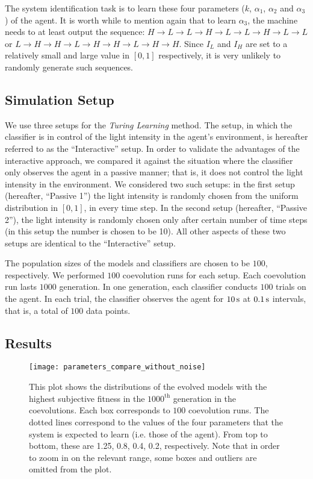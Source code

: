 The system identification task is to learn these four parameters ($k$, $\alpha_1$, $\alpha_2$ and $\alpha_3$) of the agent. It is worth while to mention again that to learn $\alpha_3$, the machine needs to at least output the sequence: $H\rightarrow L\rightarrow L\rightarrow H\rightarrow L\rightarrow L\rightarrow H\rightarrow L\rightarrow L$ or $L\rightarrow H\rightarrow H\rightarrow L\rightarrow H\rightarrow H\rightarrow L\rightarrow H\rightarrow H$. Since $I_L$ and $I_H$ are set to a relatively small and large value in $[0,1]$ respectively, it is very unlikely to randomly generate such sequences.

\subsection{Simulation Setup}\label{sec:simulation_setup_deterministic_interaction}

We use three setups for the \textit{Turing Learning} method. The setup, in which the classifier is in control of the light intensity in the agent's environment, is hereafter referred to as the ``Interactive'' setup. In order to validate the advantages of the interactive approach, we compared it against the situation where the classifier only observes the agent in a passive manner; that is, it does not control the light intensity in the environment. We considered two such setups: in the first setup (hereafter, ``Passive 1'') the light intensity is randomly chosen from the uniform distribution in $\left[0,1\right]$, in every time step. In the second setup (hereafter, ``Passive 2''), the light intensity is randomly chosen only after certain number of time steps (in this setup the number is chosen to be 10). All other aspects of these two setups are identical to the ``Interactive'' setup. 

The population sizes of the models and classifiers are chosen to be $100$, respectively. We performed $100$ coevolution runs for each setup. Each coevolution run lasts $1000$ generation. In one generation, each classifier conducts $100$ trials on the agent. In each trial, the classifier observes the agent for $\unit[10]{s}$ at $\unit[0.1]{s}$ intervals, that is, a total of $100$ data points.

\subsection{Results}\label{sec:results_interaction_deterministic}

\begin{figure}[!t]%
	\centering
	\texttt{[image: parameters\_compare\_without\_noise]}
	\caption{This plot shows the distributions of the evolved models with the highest subjective fitness in the $1000^\textrm{th}$ generation in the coevolutions. Each box corresponds to $100$ coevolution runs. The dotted lines correspond to the values of the four parameters that the system is expected to learn (i.e. those of the agent). From top to bottom, these are 1.25, 0.8, 0.4, 0.2, respectively. Note that in order to zoom in on the relevant range, some boxes and outliers are omitted from the plot.\label{fig:parameters_compare_without_noise}}
\end{figure}

